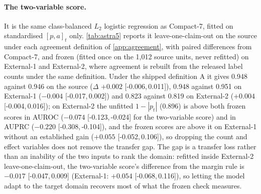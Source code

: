 \documentclass[11pt]{article}
\newcommand{\compact}{Compact-7\xspace}
\newcommand{\ci}[2]{[#1,\,#2]}
\begin{document}
\paragraph{The two-variable score.} It is the same class-balanced $L_2$ logistic regression as
\compact, fitted on standardised $[p,a]_t$ only. \cref{tab:astra5} reports it
leave-one-claim-out on the source under each agreement definition of
\cref{app:agreement}, with paired differences from \compact, and frozen (fitted once on
the 1{,}012 source units, never refitted) on External-1 and External-2, where agreement is rebuilt
from the released label counts under the same definition. Under the shipped definition A it gives
0.948 against 0.946 on the source ($\Delta$ $+0.002$ \ci{-0.006}{0.011}), 0.948 against 0.951 on
External-1 ($-0.004$ \ci{-0.017}{0.002}) and 0.823 against 0.819 on External-2 ($+0.004$
\ci{-0.004}{0.016}); on External-2 the unfitted $1-|p_t|$ (0.896) is above both frozen scores
in AUROC ($-0.074$ \ci{-0.123}{-0.024} for the two-variable score) and in AUPRC ($-0.220$
\ci{-0.308}{-0.104}), and the frozen scores are above it on External-1 without an established gain
($+0.055$ \ci{-0.052}{0.106}), so dropping the count and effect variables does not remove the
transfer gap. The gap is a transfer loss rather than an inability of the two inputs to rank the
domain: refitted inside External-2 leave-one-claim-out, the two-variable score's difference from
the margin rule is $-0.017$ \ci{-0.047}{0.009} (External-1: $+0.054$ \ci{-0.068}{0.116}), so
letting the model adapt to the target domain recovers most of what the frozen check measures.
\end{document}
